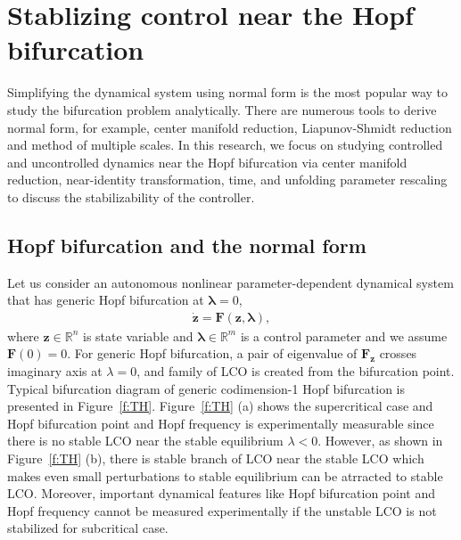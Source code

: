 \documentclass[openacc]{rsproca_new}%
\def\real{\mathbb{R}}
\def\vec#1{\ensuremath{\mathbf{#1}}}
\newcommand{\Fref}[1]{Figure~\ref{#1}}
\begin{document}
\section{Stablizing control near the Hopf bifurcation}\label{SNH}

Simplifying the dynamical system using normal form is the most popular way to study the bifurcation problem analytically. There are numerous tools to derive normal form, for example, center manifold reduction, Liapunov-Shmidt reduction and method of multiple scales. In this research, we focus on studying controlled and uncontrolled dynamics near the Hopf bifurcation via center manifold reduction, near-identity transformation, time, and unfolding parameter rescaling to discuss the stabilizability of the controller.

\subsection{Hopf bifurcation and the normal form}\label{SNF}

Let us consider an autonomous nonlinear parameter-dependent dynamical system that has generic Hopf bifurcation at \(\vec{\lambda}=0\),
\begin{align}\label{eq:1}
  \dot{\vec{z}} =\vec{F}(\vec{z},\vec{\lambda}),
\end{align}
where \(\vec{z}\in \real^n\) is state variable and \(\vec{\lambda}\in\real^m\) is a control parameter and we assume \(\vec{F}(0)=0\). For generic Hopf bifurcation, a pair of eigenvalue of $\vec{F}_\vec{z}$ crosses imaginary axis at $\lambda=0$, and family of LCO is created from the bifurcation point. Typical bifurcation diagram of generic codimension-1 Hopf bifurcation is presented in \Fref{f:TH}. \Fref{f:TH} (a) shows the supercritical case and Hopf bifurcation point and Hopf frequency is experimentally measurable since there is no stable LCO near the stable equilibrium $\lambda < 0$. However, as shown in \Fref{f:TH} (b), there is stable branch of LCO near the stable LCO which makes even small perturbations to stable equilibrium can be atrracted to stable LCO. Moreover, important dynamical features like Hopf bifurcation point and Hopf frequency cannot be measured experimentally if the unstable LCO is not stabilized for subcritical case.
\end{document}
